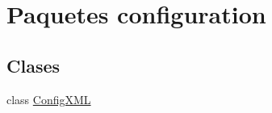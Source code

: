 \hypertarget{namespaceconfiguration}{}\section{Paquetes configuration}
\label{namespaceconfiguration}
\subsection*{Clases}
\begin{DoxyCompactItemize}
\item 
class \mbox{\hyperlink{classconfiguration_1_1ConfigXML}{Config\+X\+ML}}
\end{DoxyCompactItemize}
